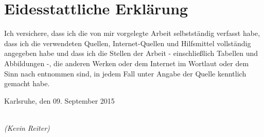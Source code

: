 \section*{Eidesstattliche Erklärung}
\begin{large}

Ich versichere, dass ich die von mir vorgelegte Arbeit selbstständig verfasst habe, dass ich die verwendeten Quellen, Internet-Quellen und Hilfsmittel vollständig angegeben habe und dass ich die Stellen der Arbeit - einschließlich Tabellen und Abbildungen -, die anderen Werken oder dem Internet im Wortlaut oder dem Sinn nach entnommen sind, in jedem Fall unter Angabe der Quelle kenntlich gemacht habe.\vspace{2cm}

\noindent
Karlsruhe, den 09. September 2015

\vspace{3cm}

\hspace*{6cm}%
\dotfill\\
\hspace*{7cm}%
\textit{(Kevin Reiter)}

\end{large}
